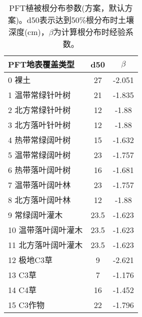 \begin{table}[]
    \centering
    \caption{PFT植被根分布参数(\citet{schenk2002rooting}方案，默认方案)。d50表示达到50\%根分布时土壤深度(cm)，$\beta$为计算根分布时经验系数。}
    \label{tab:PFTSchenkANDJackson2002方案默认方案}
   \begin{tabular}{@{}lcc@{}}
    \toprule
    PFT地表覆盖类型     & d50  & $\beta$ \\ \midrule
    0 裸土        & 27   & -2.051 \\
    1 温带常绿针叶树   & 21   & -1.835 \\
    2 北方常绿针叶树   & 12   & -1.88  \\
    3 北方落叶针叶树   & 12   & -1.88  \\
    4 热带常绿阔叶树   & 15   & -1.632 \\
    5 温带常绿阔叶树   & 23   & -1.757 \\
    6 热带落叶阔叶树   & 16   & -1.681 \\
    7 温带落叶阔叶林   & 23   & -1.757 \\
    8 北方落叶阔叶林   & 12   & -1.88  \\
    9 常绿阔叶灌木    & 23.5 & -1.623 \\
    10 温带落叶阔叶灌木 & 23.5 & -1.623 \\
    11 北方落叶阔叶灌木 & 23.5 & -1.623 \\
    12 极地C3草    & 9    & -2.621 \\
    13 C3草      & 7    & -1.176 \\
    14 C4草      & 16   & -1.452 \\
    15 C3作物     & 22   & -1.796 \\ \bottomrule
\end{tabular}
\end{table}


